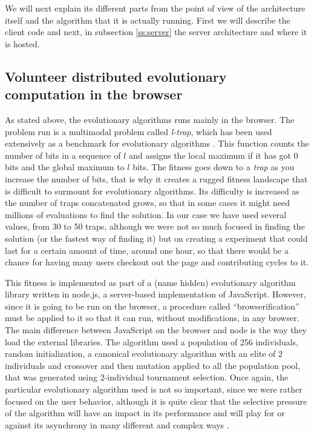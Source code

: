 \documentclass{sig-alternate}
\begin{document}
We will next explain its different parts from the point of
view of the architecture itself and the algorithm that it is actually
running. First we will describe the client code and next, in
subsection \ref{ss:server} the server architecture and where it is
hosted. 

\subsection{Volunteer distributed evolutionary computation in the
  browser}

As stated above, the evolutionary algorithms runs mainly in the
browser. The problem run is a multimodal problem called {\em l-trap},
which has been used extensively as a benchmark for evolutionary
algorithms \cite{fernandes2009using,nijssen2003analysis}. This
function counts the number of bits in a sequence of $l$ and assigns
the local maximum if it has got 0 bits and the global maximum to $l$
bits. The fitness goes down to a {\em trap} as you increase the number
of bits, that is why it creates a rugged fitness landscape that is
difficult to surmount for evolutionary algorithms. Its difficulty is
increased as the number of traps concatenated grows, so that in some
cases it might need millions of evaluations to find the solution. In
our case we have used several values, from 30 to 50 traps, although we
were not so much focused in finding the solution (or the fastest way
of finding it) but on creating a experiment that could last for a
certain amount of time, around one hour, so that there would be a
chance for having many users checkout out the page and contributing
cycles to it. 

This fitness is implemented as part of a (name hidden) evolutionary
algorithm library written in node.js, a server-based implementation of
JavaScript. However, since it is going to be run on the browser, a
procedure called ``browserification'' must be applied to it so that it
can run, without modifications, in any browser. The main difference
between JavaScript on the browser and node is the way they load the
external libraries. The algorithm used a population of 256
individuals, random initialization, a canonical evolutionary algorithm
with an elite of 2 individuals and crossover and then mutation applied
to all the population pool, that was generated using 2-individual
tournament selection. Once again, the particular evolutionary
algorithm used is not so important, since we were rather focused on
the user behavior, although it is quite clear that the selective
pressure of the algorithm will have an impact in its performance and
will play for or against its asynchrony in many different and complex
ways \cite{jj:2008:PPSN}. 
\end{document}
